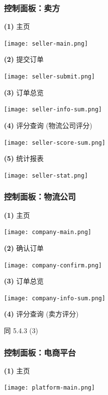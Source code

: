 \documentclass[12pt]{article}
\begin{document}
\subsubsection{控制面板：卖方}
\noindent \textbf{(1)} 主页
\begin{center}
	\texttt{[image: seller-main.png]}
\end{center}

\noindent \textbf{(2)} 提交订单
\begin{center}
	\texttt{[image: seller-submit.png]}
\end{center}

\noindent \textbf{(3)} 订单总览
\begin{center}
	\texttt{[image: seller-info-sum.png]}
\end{center}

\noindent \textbf{(4)} 评分查询 (物流公司评分)
\begin{center}
	\texttt{[image: seller-score-sum.png]}
\end{center}

\noindent \textbf{(5)} 统计报表
\begin{center}
	\texttt{[image: seller-stat.png]}
\end{center}

\subsubsection{控制面板：物流公司}
\noindent \textbf{(1)} 主页
\begin{center}
	\texttt{[image: company-main.png]}
\end{center}

\noindent \textbf{(2)} 确认订单
\begin{center}
	\texttt{[image: company-confirm.png]}
\end{center}

\noindent \textbf{(3)} 订单总览
\begin{center}
	\texttt{[image: company-info-sum.png]}
\end{center}

\noindent \textbf{(4)} 评分查询 (卖方评分)

同 5.4.3 (3)

\subsubsection{控制面板：电商平台}
\noindent \textbf{(1)} 主页
\begin{center}
	\texttt{[image: platform-main.png]}
\end{center}
\end{document}
